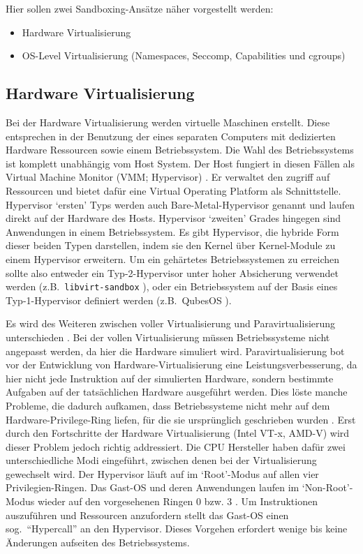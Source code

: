 Hier sollen zwei Sandboxing-Ansätze näher vorgestellt werden: 

\begin{itemize}
    \item Hardware Virtualisierung
    \item OS-Level Virtualisierung (Namespaces, Seccomp, Capabilities und cgroups)
\end{itemize}

\subsection{Hardware Virtualisierung}

Bei der Hardware Virtualisierung werden virtuelle Maschinen erstellt. Diese entsprechen in der Benutzung der eines separaten Computers mit dedizierten Hardware Ressourcen sowie einem Betriebssystem. Die Wahl des Betriebssystems ist komplett unabhängig vom Host System. Der Host fungiert in diesen Fällen als Virtual Machine Monitor (VMM; Hypervisor) \cite{uhlig-intel}. Er verwaltet den zugriff auf Ressourcen und bietet dafür eine Virtual Operating Platform als Schnittstelle.
Hypervisor `ersten' Typs werden auch Bare-Metal-Hypervisor genannt und laufen direkt auf der Hardware des Hosts. Hypervisor `zweiten' Grades hingegen sind Anwendungen in einem Betriebssystem. Es gibt Hypervisor, die hybride Form dieser beiden Typen darstellen, indem sie den Kernel über Kernel-Module zu einem Hypervisor erweitern.
Um ein gehärtetes Betriebssystemen zu erreichen sollte also entweder ein Typ-2-Hypervisor unter hoher Absicherung verwendet werden (z.B.\ \texttt{libvirt-sandbox} \cite{libvirt-sandbox}), oder ein Betriebssystem auf der Basis eines Typ-1-Hypervisor definiert werden (z.B.\ QubesOS \cite{qubes}). 

Es wird des Weiteren zwischen voller Virtualisierung und Paravirtualisierung unterschieden \cite{xen}. Bei der vollen Virtualisierung müssen Betriebssysteme nicht angepasst werden, da hier die Hardware simuliert wird. Paravirtualisierung bot vor der Entwicklung von Hardware-Virtualisierung eine Leistungsverbesserung, da hier nicht jede Instruktion auf der simulierten Hardware, sondern bestimmte Aufgaben auf der tatsächlichen Hardware ausgeführt werden. Dies löste manche Probleme, die
dadurch aufkamen, dass Betriebssysteme nicht mehr auf dem Hardware-Privilege-Ring liefen, für die sie ursprünglich geschrieben wurden \cite{uhlig-intel}. Erst durch den Fortschritte der Hardware Virtualisierung (Intel VT-x, AMD-V) wird dieser Problem jedoch richtig addressiert. Die CPU Hersteller haben dafür zwei unterschiedliche Modi eingeführt, zwischen denen bei der Virtualisierung gewechselt wird. Der Hypervisor läuft auf im `Root'-Modus auf allen vier Privilegien-Ringen. Das Gast-OS
und deren Anwendungen laufen im `Non-Root'-Modus wieder auf den vorgesehenen Ringen 0 bzw. 3 \cite{uhlig-intel}. Um Instruktionen auszuführen und Ressourcen anzufordern stellt das Gast-OS einen sog.\ ``Hypercall'' an den Hypervisor. Dieses Vorgehen erfordert wenige bis keine Änderungen aufseiten des Betriebssystems. 

